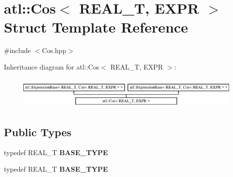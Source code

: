 \hypertarget{structatl_1_1_cos}{\section{atl\+:\+:Cos$<$ R\+E\+A\+L\+\_\+\+T, E\+X\+P\+R $>$ Struct Template Reference}
\label{structatl_1_1_cos}
}


{\ttfamily \#include $<$Cos.\+hpp$>$}

Inheritance diagram for atl\+:\+:Cos$<$ R\+E\+A\+L\+\_\+\+T, E\+X\+P\+R $>$\+:\begin{figure}[H]
\begin{center}
\leavevmode
\includegraphics[height=1.637427cm]{structatl_1_1_cos}
\end{center}
\end{figure}
\subsection*{Public Types}
\begin{DoxyCompactItemize}
\item 
\hypertarget{structatl_1_1_cos_abb2ceaf23e6adb597d390e500ac15b75}{typedef R\+E\+A\+L\+\_\+\+T {\bfseries B\+A\+S\+E\+\_\+\+T\+Y\+P\+E}}\label{structatl_1_1_cos_abb2ceaf23e6adb597d390e500ac15b75}

\item 
\hypertarget{structatl_1_1_cos_abb2ceaf23e6adb597d390e500ac15b75}{typedef R\+E\+A\+L\+\_\+\+T {\bfseries B\+A\+S\+E\+\_\+\+T\+Y\+P\+E}}\label{structatl_1_1_cos_abb2ceaf23e6adb597d390e500ac15b75}

\end{DoxyCompactItemize}
